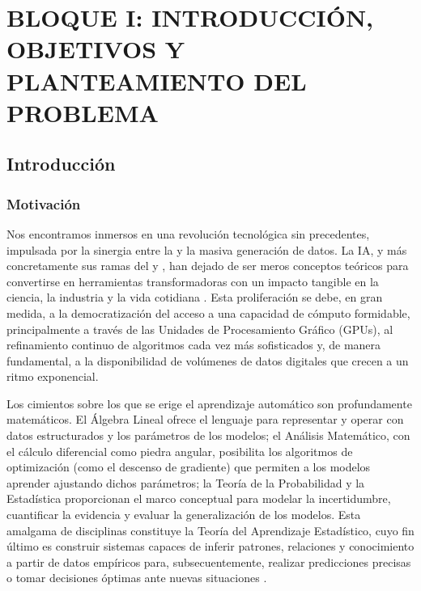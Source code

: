 \part{BLOQUE I: INTRODUCCIÓN, OBJETIVOS Y PLANTEAMIENTO DEL PROBLEMA}

\chapter{Introducción}
\label{ch:introduccion_objetivos}

\glsresetall

\section{Motivación}
\label{subsec:contextualizacion_intro}

Nos encontramos inmersos en una revolución tecnológica sin precedentes, impulsada por la sinergia entre la  y la masiva generación de datos. La IA, y más concretamente sus ramas del  y , han dejado de ser meros conceptos teóricos para convertirse en herramientas transformadoras con un impacto tangible en la ciencia, la industria y la vida cotidiana \citep{Goodfellow2016}. Esta proliferación se debe, en gran medida, a la democratización del acceso a una capacidad de cómputo formidable, principalmente a través de las Unidades de Procesamiento Gráfico (GPUs), al refinamiento continuo de algoritmos cada vez más sofisticados y, de manera fundamental, a la disponibilidad de volúmenes de datos digitales que crecen a un ritmo exponencial.

Los cimientos sobre los que se erige el aprendizaje automático son profundamente matemáticos. El Álgebra Lineal ofrece el lenguaje para representar y operar con datos estructurados y los parámetros de los modelos; el Análisis Matemático, con el cálculo diferencial como piedra angular, posibilita los algoritmos de optimización (como el descenso de gradiente) que permiten a los modelos aprender ajustando dichos parámetros; la Teoría de la Probabilidad y la Estadística proporcionan el marco conceptual para modelar la incertidumbre, cuantificar la evidencia y evaluar la generalización de los modelos. Esta amalgama de disciplinas constituye la Teoría del Aprendizaje Estadístico, cuyo fin último es construir sistemas capaces de inferir patrones, relaciones y conocimiento a partir de datos empíricos para, subsecuentemente, realizar predicciones precisas o tomar decisiones óptimas ante nuevas situaciones \citep{Hastie2009}.

